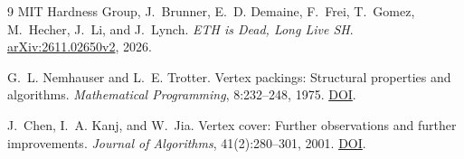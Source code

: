 \documentclass[11pt]{article}
\begin{document}
\begin{thebibliography}{9}
MIT Hardness Group, J.~Brunner, E.~D. Demaine, F.~Frei, T.~Gomez,
M.~Hecher, J.~Li, and J.~Lynch.
\emph{ETH is Dead, Long Live SH}.
\href{https://arxiv.org/abs/2611.02650v2}{arXiv:2611.02650v2}, 2026.

G.~L. Nemhauser and L.~E. Trotter.
Vertex packings: Structural properties and algorithms.
\emph{Mathematical Programming}, 8:232--248, 1975.
\href{https://doi.org/10.1007/BF01580444}{DOI}.

J.~Chen, I.~A. Kanj, and W.~Jia.
Vertex cover: Further observations and further improvements.
\emph{Journal of Algorithms}, 41(2):280--301, 2001.
\href{https://doi.org/10.1006/jagm.2001.1186}{DOI}.
\end{thebibliography}
\end{document}
